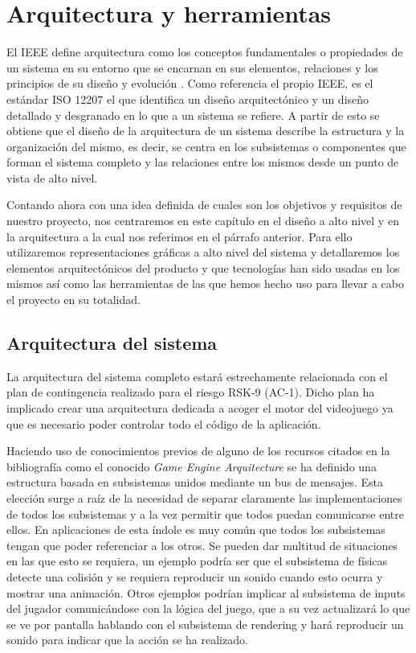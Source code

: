 \chapter{Arquitectura y herramientas}

El IEEE define arquitectura como los conceptos fundamentales o propiedades de un sistema en su entorno que se encarnan en sus elementos, relaciones y los principios de su diseño y evolución \cite{definiendo_arquitectura}.
Como referencia el propio IEEE, es el estándar ISO 12207 el que identifica un diseño arquitectónico y un diseño detallado y desgranado en lo que a un sistema se refiere. A partir de esto se obtiene que el diseño de la arquitectura de un sistema describe la estructura y la organización del mismo, es decir, se centra en los subsistemas o componentes que forman el sistema completo y las relaciones entre los mismos desde un punto de vista de alto nivel.

\bigskip

Contando ahora con una idea definida de cuales son los objetivos y requisitos de nuestro proyecto, nos centraremos en este capítulo en el diseño a alto nivel y en la arquitectura a la cual nos referimos en el párrafo anterior. Para ello utilizaremos representaciones gráficas a alto nivel del sistema y detallaremos los elementos arquitectónicos del producto y que tecnologías han sido usadas en los mismos así como las herramientas de las que hemos hecho uso para llevar a cabo el proyecto en su totalidad.

\section{Arquitectura del sistema}

La arquitectura del sistema completo estará estrechamente relacionada con el plan de contingencia realizado para el riesgo RSK-9 (AC-1). Dicho plan ha implicado crear una arquitectura dedicada a acoger el motor del videojuego ya que es necesario poder controlar todo el código de la aplicación.

\bigskip

Haciendo uso de conocimientos previos de alguno de los recursos citados en la bibliografía como el conocido \textit{Game Engine Arquitecture}\cite{game_engine} se ha definido una estructura basada en subsistemas unidos mediante un bus de mensajes. Esta elección surge a raíz de la necesidad de separar claramente las implementaciones de todos los subsistemas y a la vez permitir que todos puedan comunicarse entre ellos. En aplicaciones de esta índole es muy común que todos los subsistemas tengan que poder referenciar a los otros. Se pueden dar multitud de situaciones en las que esto se requiera, un ejemplo podría ser que el subsistema de físicas detecte una colisión y se requiera reproducir un sonido cuando esto ocurra y mostrar una animación. Otros ejemplos podrían implicar al subsistema de inputs del jugador comunicándose con la lógica del juego, que a su vez actualizará lo que se ve por pantalla hablando con el subsistema de rendering y hará reproducir un sonido para indicar que la acción se ha realizado.

